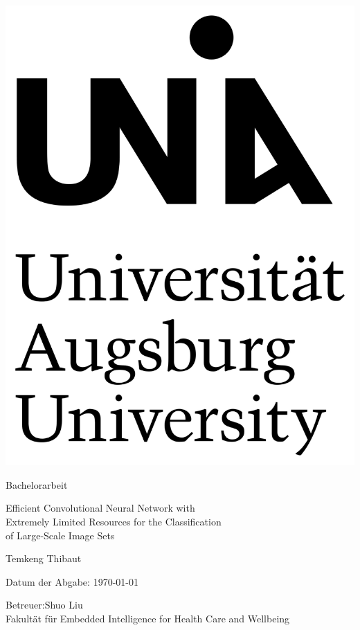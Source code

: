 \documentclass[12pt,a4paper]{scrartcl}
\numberwithin{equation}{section}
\begin{document}
  \pagestyle{empty}

  \begin{titlepage}

    \includegraphics[scale=0.05]{logo_uni} 
    \vspace*{2cm} 

 \begin{center} \large 
    
    Bachelorarbeit
    \vspace*{2cm}

    
    {\LARGE Efficient Convolutional Neural Network with \\Extremely Limited Resources 
    for the Classification \\of Large-Scale Image Sets}
    \vspace*{2.5cm}

	Temkeng Thibaut
    \vspace*{1.5cm}

    Datum der Abgabe: \today
    \vspace*{4.5cm}


    Betreuer:Shuo Liu \\[1cm]
    Fakultät für Embedded Intelligence for Health Care and Wellbeing \\[1cm]

  \end{center}
\end{titlepage}
\end{document}
